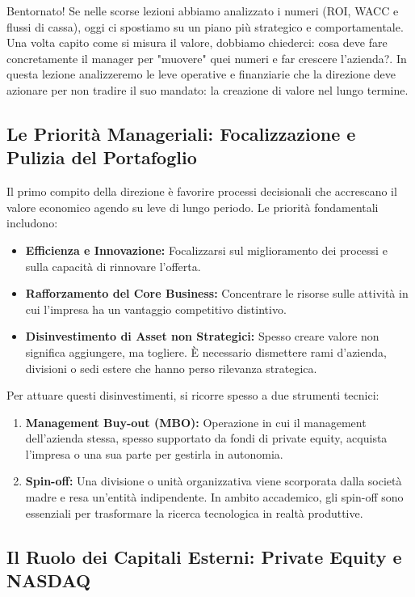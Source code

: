 \documentclass[a4paper,10pt]{article}
\begin{document}
Bentornato! Se nelle scorse lezioni abbiamo analizzato i numeri (ROI, WACC e flussi di cassa), oggi ci spostiamo su un piano più strategico e comportamentale. Una volta capito come si misura il valore, dobbiamo chiederci: cosa deve fare concretamente il manager per "muovere" quei numeri e far crescere l'azienda?. In questa lezione analizzeremo le leve operative e finanziarie che la direzione deve azionare per non tradire il suo mandato: la creazione di valore nel lungo termine.

\subsection*{Le Priorità Manageriali: Focalizzazione e Pulizia del Portafoglio}

Il primo compito della direzione è favorire processi decisionali che accrescano il valore economico agendo su leve di lungo periodo. Le priorità fondamentali includono:
\begin{itemize}
    \item \textbf{Efficienza e Innovazione:} Focalizzarsi sul miglioramento dei processi e sulla capacità di rinnovare l'offerta.
    \item \textbf{Rafforzamento del Core Business:} Concentrare le risorse sulle attività in cui l'impresa ha un vantaggio competitivo distintivo.
    \item \textbf{Disinvestimento di Asset non Strategici:} Spesso creare valore non significa aggiungere, ma togliere. È necessario dismettere rami d'azienda, divisioni o sedi estere che hanno perso rilevanza strategica.
\end{itemize}

Per attuare questi disinvestimenti, si ricorre spesso a due strumenti tecnici:
\begin{enumerate}
    \item \textbf{Management Buy-out (MBO):} Operazione in cui il management dell'azienda stessa, spesso supportato da fondi di private equity, acquista l'impresa o una sua parte per gestirla in autonomia.
    \item \textbf{Spin-off:} Una divisione o unità organizzativa viene scorporata dalla società madre e resa un'entità indipendente. In ambito accademico, gli spin-off sono essenziali per trasformare la ricerca tecnologica in realtà produttive.
\end{enumerate}

\subsection*{Il Ruolo dei Capitali Esterni: Private Equity e NASDAQ}
\end{document}
